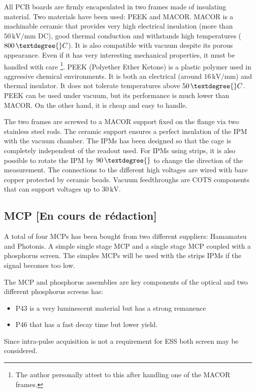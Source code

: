 \begin{refsection}
  All PCB boards are firmly encapsulated in two frames made of insulating material. Two materials have been used: PEEK and MACOR. MACOR is a machinable ceramic that provides very high electrical insulation (more than $50\,\mathrm{kV/mm}$ DC),  good thermal conduction and withstands high temperatures ($800\,\textdegree{}C$). It is also compatible with vacuum despite its porous appearance. Even if it has very interesting mechanical properties, it must be handled with care \footnote{The author personally attest to this after handling one of the MACOR frames.}. PEEK (Polyether Ether Ketone) is a plastic polymer used in aggressive chemical environments. It is both an electrical (around $16\,\mathrm{kV/mm}$) and thermal insulator. It does not tolerate temperatures above $50\,\textdegree{}C$. PEEK can be used under vacuum, but its performance is much lower than MACOR. On the other hand, it is cheap and easy to handle.

  The two frames are screwed to a MACOR support fixed on the flange via two stainless steel rods. The ceramic support ensures a perfect insulation of the IPM with the vacuum chamber. The IPMs has been designed so that the cage is completely independent of the readout used. For IPMs using strips, it is also possible to rotate the IPM by $90\,\textdegree{}$ to change the direction of the measurement. The connections to the different high voltages are wired with bare copper  protected by ceramic beads. Vacuum feedthroughs are COTS components that can support voltages up to $30\,\mathrm{kV}$.

  \subsection{MCP [En cours de rédaction]}
  A total of four MCPs has been bought from two different suppliers: Hamamatsu and Photonis. A simple single stage MCP and a single stage MCP coupled with a phosphorus screen. The simples MCPs will be used with the strips IPMs if the signal becomes too low.

  The MCP and phosphorus assemblies are key components of the optical and two different phosphorus screens has:
  \begin{itemize}
    \item P43 is a very luminescent material but has a strong remanence
    \item P46 that has a fast decay time but lower yield.
  \end{itemize}
  Since intra-pulse acquisition is not a requirement for ESS both screen may be considered.


\end{refsection}
